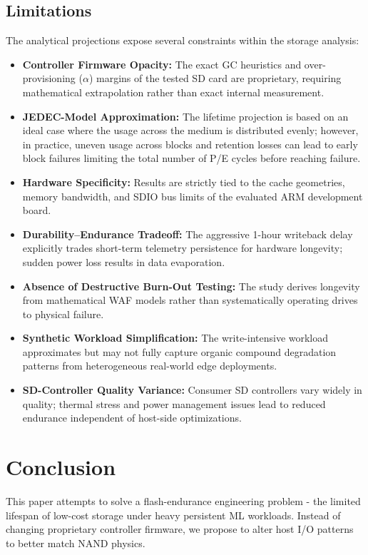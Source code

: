 \documentclass[conference]{IEEEtran}
\begin{document}
\subsection{Limitations}
The analytical projections expose several constraints within the storage analysis:
\begin{itemize}
    \item \textbf{Controller Firmware Opacity:} The exact GC heuristics and over-provisioning ($\alpha$) margins of the tested SD card are proprietary, requiring mathematical extrapolation rather than exact internal measurement.
    \item \textbf{JEDEC-Model Approximation:} The lifetime projection is based on an ideal case where the usage across the medium is distributed evenly; however, in practice, uneven usage across blocks and retention losses can lead to early block failures limiting the total number of P/E cycles before reaching failure.
    \item \textbf{Hardware Specificity:} Results are strictly tied to the cache geometries, memory bandwidth, and SDIO bus limits of the evaluated ARM development board.
    \item \textbf{Durability--Endurance Tradeoff:} The aggressive 1-hour writeback delay explicitly trades short-term telemetry persistence for hardware longevity; sudden power loss results in data evaporation.
    \item \textbf{Absence of Destructive Burn-Out Testing:} The study derives longevity from mathematical WAF models rather than systematically operating drives to physical failure.
    \item \textbf{Synthetic Workload Simplification:} The write-intensive workload approximates but may not fully capture organic compound degradation patterns from heterogeneous real-world edge deployments.
    \item \textbf{SD-Controller Quality Variance:} Consumer SD controllers vary widely in quality; thermal stress and power management issues lead to reduced endurance independent of host-side optimizations.
\end{itemize}

\section{Conclusion}

This paper attempts to solve a flash-endurance engineering problem - the limited lifespan of low-cost storage under heavy persistent ML workloads. Instead of changing proprietary controller firmware, we propose to alter host I/O patterns to better match NAND physics.
\end{document}
